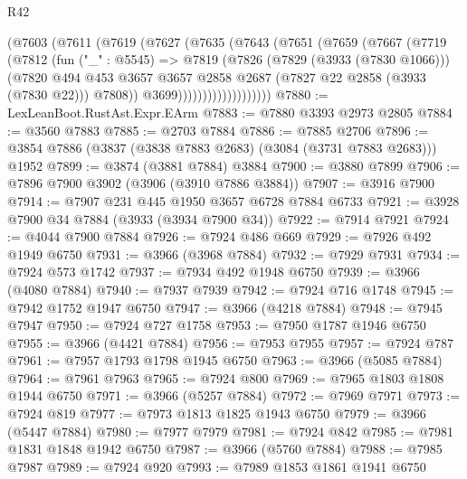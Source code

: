 \begin{lexlean}{R42}
\begin{coremodule}
                  (@7603
                    (@7611
                      (@7619
                        (@7627
                          (@7635
                            (@7643
                              (@7651
                                (@7659
                                  (@7667
                                    (@7719
                                      (@7812
                                        (fun ("_" : @5545) =>
                                        @7819
                                          (@7826
                                            (@7829 (@3933 (@7830 @1066)))
                                            (@7820
                                              @494
                                              @453
                                              @3657
                                              @3657
                                              @2858
                                              @2687
                                              (@7827 @22 @2858 (@3933 (@7830 @22)))
                                              @7808))
                                          @3699)))))))))))))))))))
@7880 := LexLeanBoot.RustAst.Expr.EArm
@7883 := @7880 @3393 @2973 @2805
@7884 := @3560 @7883
@7885 := @2703 @7884
@7886 := @7885 @2706
@7896 := @3854 @7886 (@3837 (@3838 @7883 @2683) (@3084 (@3731 @7883 @2683))) @1952
@7899 := @3874 (@3881 @7884) @3884
@7900 := @3880 @7899
@7906 := @7896 @7900 @3902 (@3906 (@3910 @7886 @3884))
@7907 := @3916 @7900
@7914 := @7907 @231 @445 @1950 @3657 @6728 @7884 @6733
@7921 := @3928 @7900 @34 @7884 (@3933 (@3934 @7900 @34))
@7922 := @7914 @7921
@7924 := @4044 @7900 @7884
@7926 := @7924 @486 @669
@7929 := @7926 @492 @1949 @6750
@7931 := @3966 (@3968 @7884)
@7932 := @7929 @7931
@7934 := @7924 @573 @1742
@7937 := @7934 @492 @1948 @6750
@7939 := @3966 (@4080 @7884)
@7940 := @7937 @7939
@7942 := @7924 @716 @1748
@7945 := @7942 @1752 @1947 @6750
@7947 := @3966 (@4218 @7884)
@7948 := @7945 @7947
@7950 := @7924 @727 @1758
@7953 := @7950 @1787 @1946 @6750
@7955 := @3966 (@4421 @7884)
@7956 := @7953 @7955
@7957 := @7924 @787
@7961 := @7957 @1793 @1798 @1945 @6750
@7963 := @3966 (@5085 @7884)
@7964 := @7961 @7963
@7965 := @7924 @800
@7969 := @7965 @1803 @1808 @1944 @6750
@7971 := @3966 (@5257 @7884)
@7972 := @7969 @7971
@7973 := @7924 @819
@7977 := @7973 @1813 @1825 @1943 @6750
@7979 := @3966 (@5447 @7884)
@7980 := @7977 @7979
@7981 := @7924 @842
@7985 := @7981 @1831 @1848 @1942 @6750
@7987 := @3966 (@5760 @7884)
@7988 := @7985 @7987
@7989 := @7924 @920
@7993 := @7989 @1853 @1861 @1941 @6750

\end{coremodule}
\end{lexlean}
